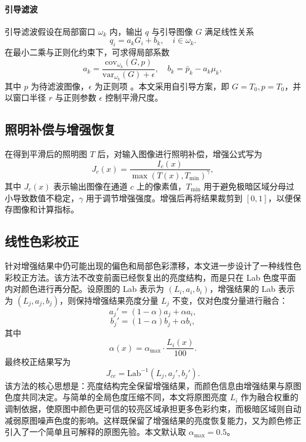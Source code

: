 \documentclass[10pt,twocolumn,letterpaper]{article}
\begin{document}
\paragraph{引导滤波}
引导滤波假设在局部窗口 $\omega_k$ 内，输出 $q$ 与引导图像 $G$ 满足线性关系
\begin{equation}
q_i=a_k G_i+b_k,\quad i\in \omega_k.
\end{equation}
在最小二乘与正则化约束下，可求得局部系数
\begin{equation}
a_k=\frac{\mathrm{cov}_{\omega_k}(G,p)}{\mathrm{var}_{\omega_k}(G)+\epsilon},\quad
b_k=\bar{p}_k-a_k\mu_k,
\end{equation}
其中 $p$ 为待滤波图像，$\epsilon$ 为正则项 \cite{he2010guided,he2013guided}。本文采用自引导方案，即 $G=T_0,p=T_0$，并以窗口半径 $r$ 与正则参数 $\epsilon$ 控制平滑尺度。

\subsection{照明补偿与增强恢复}
在得到平滑后的照明图 $T$ 后，对输入图像进行照明补偿，增强公式写为
\begin{equation}
J_c(x)=\frac{I_c(x)}{\max(T(x),T_{\min})^\gamma},
\end{equation}
其中 $J_c(x)$ 表示输出图像在通道 $c$ 上的像素值，$T_{\min}$ 用于避免极暗区域分母过小导致数值不稳定，$\gamma$ 用于调节增强强度。增强后再将结果裁剪到 $[0,1]$，以便保存图像和计算指标。

\subsection{线性色彩校正}
针对增强结果中仍可能出现的偏色和局部色彩漂移，本文进一步设计了一种线性色彩校正方法。该方法不改变前面已经恢复出的亮度结构，而是只在 Lab 色度平面内对颜色进行再分配。设原图的 Lab 表示为 $(L_i,a_i,b_i)$，增强结果的 Lab 表示为 $(L_j,a_j,b_j)$，则保持增强结果亮度分量 $L_j$ 不变，仅对色度分量进行融合：
\begin{equation}
a_j'=(1-\alpha)a_j+\alpha a_i,
\end{equation}
\begin{equation}
b_j'=(1-\alpha)b_j+\alpha b_i,
\end{equation}
其中
\begin{equation}
\alpha(x)=\alpha_{\max}\cdot\frac{L_i(x)}{100}.
\end{equation}
最终校正结果写为
\begin{equation}
J_{cc}=\mathrm{Lab}^{-1}(L_j,a_j',b_j').
\end{equation}
该方法的核心思想是：亮度结构完全保留增强结果，而颜色信息由增强结果与原图色度共同决定。与简单的全局色度压缩不同，本文将原图亮度 $L_i$ 作为融合权重的调制依据，使原图中颜色更可信的较亮区域承担更多色彩约束，而极暗区域则自动减弱原图噪声色度的影响。这样既保留了增强结果的亮度恢复能力，又为颜色修正引入了一个简单且可解释的原图先验。本文默认取 $\alpha_{\max}=0.5$。
\end{document}
